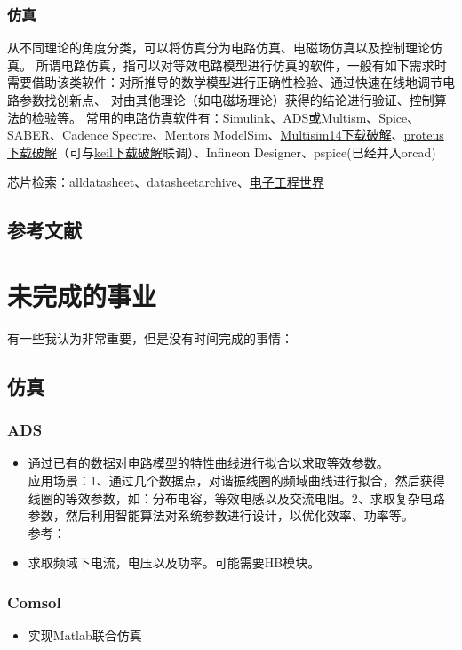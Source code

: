 \documentclass[UTF8,oneside]{ctexbook}
\begin{document}
\subsection{仿真}
从不同理论的角度分类，可以将仿真分为电路仿真、电磁场仿真以及控制理论仿真。
所谓电路仿真，指可以对等效电路模型进行仿真的软件，一般有如下需求时需要借助该类软件：对所推导的数学模型进行正确性检验、通过快速在线地调节电路参数找创新点、
对由其他理论（如电磁场理论）获得的结论进行验证、控制算法的检验等。
常用的电路仿真软件有：Simulink、ADS或Multism、Spice、SABER、Cadence Spectre、Mentors ModelSim、\href{https://mp.weixin.qq.com/s/4AQa8VciAgzS1NZvd5tM_A}{Multisim14下载破解}、\href{https://mp.weixin.qq.com/s/qb0gipvdphj0YG8iP3IyhQ}{proteus下载破解}（可与\href{https://mp.weixin.qq.com/s/NzK8HAKlY_tXBZy8lQtfsQ}{keil下载破解}联调）、Infineon Designer、pspice(已经并入orcad)

芯片检索：alldatasheet、datasheetarchive、\href{http:\\datasheet.eeworld.com.cn}{电子工程世界}


\section{参考文献}

\chapter{未完成的事业}
有一些我认为非常重要，但是没有时间完成的事情：
\section{仿真}
\subsection{ADS}
\begin{itemize}
	\item 通过已有的数据对电路模型的特性曲线进行拟合以求取等效参数。\\
	      应用场景：1、通过几个数据点，对谐振线圈的频域曲线进行拟合，然后获得线圈的等效参数，如：分布电容，等效电感以及交流电阻。2、求取复杂电路参数，然后利用智能算法对系统参数进行设计，以优化效率、功率等。\\
	      参考：
	\item 求取频域下电流，电压以及功率。可能需要HB模块。
\end{itemize}
\subsection{Comsol}
\begin{itemize}
	\item 实现Matlab联合仿真
\end{itemize}
\end{document}
